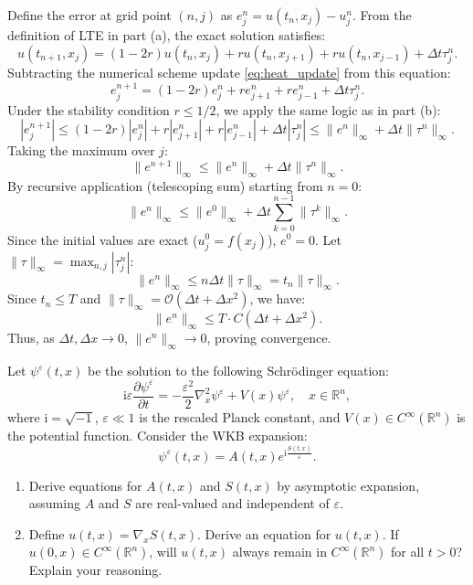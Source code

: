 \begin{solution}
Define the error at grid point $(n, j)$ as $e_j^n = u(t_n, x_j) - u_j^n$. From the definition of LTE in part (a), the exact solution satisfies:
\[ u(t_{n+1}, x_j) = (1-2r)u(t_n, x_j) + r u(t_n, x_{j+1}) + r u(t_n, x_{j-1}) + \Delta t \tau_j^n. \]
Subtracting the numerical scheme update \eqref{eq:heat_update} from this equation:
\[ e_j^{n+1} = (1-2r)e_j^n + r e_{j+1}^n + r e_{j-1}^n + \Delta t \tau_j^n. \]
Under the stability condition $r \leq 1/2$, we apply the same logic as in part (b):
\[ |e_j^{n+1}| \leq (1-2r)|e_j^n| + r|e_{j+1}^n| + r|e_{j-1}^n| + \Delta t |\tau_j^n| \leq \|e^n\|_\infty + \Delta t \|\tau^n\|_\infty. \]
Taking the maximum over $j$:
\[ \|e^{n+1}\|_\infty \leq \|e^n\|_\infty + \Delta t \|\tau^n\|_\infty. \]
By recursive application (telescoping sum) starting from $n=0$:
\[ \|e^n\|_\infty \leq \|e^0\|_\infty + \Delta t \sum_{k=0}^{n-1} \|\tau^k\|_\infty. \]
Since the initial values are exact ($u_j^0 = f(x_j)$), $e^0 = 0$. Let $\|\tau\|_\infty = \max_{n,j} |\tau_j^n|$:
\[ \|e^n\|_\infty \leq n \Delta t \|\tau\|_\infty = t_n \|\tau\|_\infty. \]
Since $t_n \leq T$ and $\|\tau\|_\infty = \mathcal{O}(\Delta t + \Delta x^2)$, we have:
\[ \|e^n\|_\infty \leq T \cdot C (\Delta t + \Delta x^2). \]
Thus, as $\Delta t, \Delta x \to 0$, $\|e^n\|_\infty \to 0$, proving convergence.
\end{solution}

\begin{exercise}
\label{applied:2023:6}
Let $\psi^\varepsilon(t, x)$ be the solution to the following Schrödinger equation:
\[
    \mathrm{i} \varepsilon \frac{\partial \psi^\varepsilon}{\partial t} = - \frac{\varepsilon^2}{2} \nabla_x^2 \psi^\varepsilon + V(x) \psi^\varepsilon, \quad x \in \mathbb{R}^n,
\]
where $\mathrm{i} = \sqrt{-1}$, $\varepsilon \ll 1$ is the rescaled Planck constant, and $V(x) \in C^\infty(\mathbb{R}^n)$ is the potential function. Consider the WKB expansion:
\[
    \psi^\varepsilon(t, x) = A(t, x) e^{\mathrm{i} \frac{S(t, x)}{\varepsilon}}.
\]

\begin{enumerate}[label=(\alph*)]
    \item Derive equations for $A(t, x)$ and $S(t, x)$ by asymptotic expansion, assuming $A$ and $S$ are real-valued and independent of $\varepsilon$.
    \item Define $u(t, x) = \nabla_x S(t, x)$. Derive an equation for $u(t, x)$. If $u(0, x) \in C^\infty(\mathbb{R}^n)$, will $u(t, x)$ always remain in $C^\infty(\mathbb{R}^n)$ for all $t > 0$? Explain your reasoning.
\end{enumerate}
\end{exercise}

